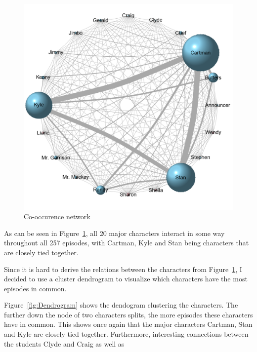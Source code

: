 \documentclass[10pt,a4paper]{article}
\begin{document}
	
	\begin{figure}[h]
	\centering
	\includegraphics[scale=0.6]{images/CoOccurenceMatrix.png}
	\caption{Co-occurence network}
	\label{fig:CoOccurence}
	\end{figure}		
	
	
	As can be seen in Figure~\ref{fig:CoOccurence}, all 20 major characters interact in some way throughout all 257 episodes, with Cartman, Kyle and Stan being characters that are closely tied together. 
	
	Since it is hard to derive the relations between the characters from Figure~\ref{fig:CoOccurence}, I decided to use a cluster dendrogram to visualize which characters have the most episodes in common.
	
	Figure~\ref{fig:Dendrogram} shows the dendogram clustering the characters. The further down the node of two characters splits, the more episodes these characters have in common. This shows once again that the major characters Cartman, Stan and Kyle are closely tied together. Furthermore, interesting connections between the students Clyde and Craig as well as 
	
\end{document}
